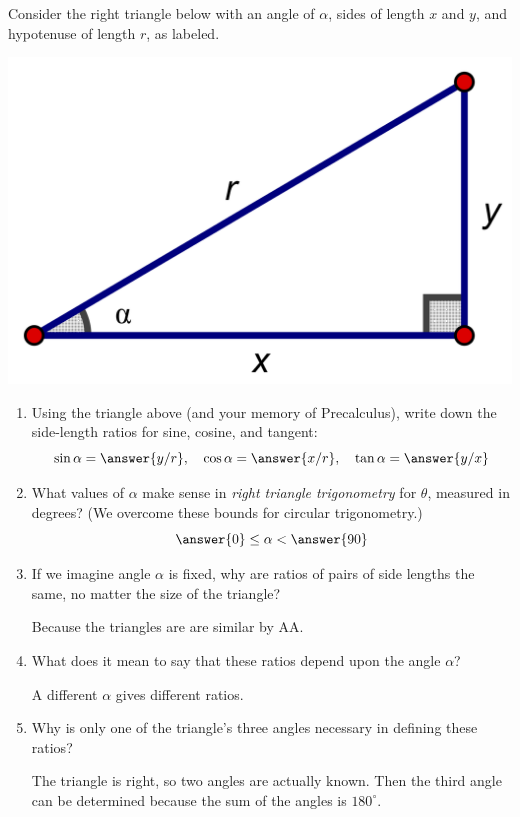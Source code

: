 \documentclass[nooutcomes]{ximera}
\begin{document}
\begin{problem}
Consider the right triangle below with an angle of $\alpha$, sides of length $x$ and $y$, and hypotenuse of length $r$, as labeled.  
\begin{image}
\includegraphics[scale=0.8]{rightTriangle.png}
\end{image}
\begin{enumerate}
\item Using the triangle above (and your memory of Precalculus), write down the side-length ratios for sine, cosine, and tangent:  
\[
\sin\alpha = \answer{y/r}, \quad
 \cos\alpha = \answer{x/r}, \quad
  \tan\alpha = \answer{y/x}
\]
\item What values of $\alpha$ make sense in \emph{right triangle trigonometry} for $\theta$, measured in degrees?  (We overcome these bounds for circular trigonometry.)
\[
\answer{0} \le \alpha < \answer{90}
\]  
\item If we imagine angle $\alpha$ is fixed, why are ratios of pairs of side lengths the same, no matter the size of the triangle?
\begin{hint}
Because the triangles are are similar by AA.  
\end{hint}
\begin{freeResponse}
\end{freeResponse}
\item What does it mean to say that these ratios depend upon the angle $\alpha$?  \begin{hint}A different $\alpha$ gives different ratios.\end{hint}
\item Why is only one of the triangle's three angles necessary in defining these ratios?  \begin{hint}The triangle is right, so two angles are actually known.  Then the third angle can be determined because the sum of the angles is $180^\circ$.\end{hint}  
\end{enumerate}
\end{problem}
\end{document}
